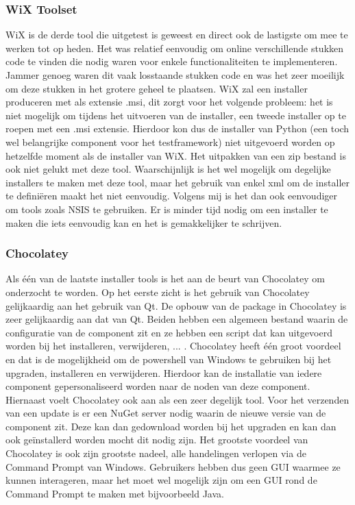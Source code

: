 \documentclass{article}
\begin{document}
\subsubsection{WiX Toolset}
WiX is de derde tool die uitgetest is geweest en direct ook de lastigste om mee te werken tot op heden.
Het was relatief eenvoudig om online verschillende stukken code te vinden die nodig waren voor enkele functionaliteiten te implementeren.
Jammer genoeg waren dit vaak losstaande stukken code en was het zeer moeilijk om deze stukken in het grotere geheel te plaatsen.
WiX zal een installer produceren met als extensie .msi, dit zorgt voor het volgende probleem: het is niet mogelijk om tijdens het uitvoeren van de installer, een tweede installer op te roepen met een .msi extensie.
Hierdoor kon dus de installer van Python (een toch wel belangrijke component voor het testframework) niet uitgevoerd worden op hetzelfde moment als de installer van WiX.
Het uitpakken van een zip bestand is ook niet gelukt met deze tool.
Waarschijnlijk is het wel mogelijk om degelijke installers te maken met deze tool, maar het gebruik van enkel xml om de installer te defini\"eren maakt het niet eenvoudig.
Volgens mij is het dan ook eenvoudiger om tools zoals NSIS te gebruiken.
Er is minder tijd nodig om een installer te maken die iets eenvoudig kan en het is gemakkelijker te schrijven.

\subsubsection{Chocolatey}
Als \'e\'en van de laatste installer tools is het aan de beurt van Chocolatey om onderzocht te worden.
Op het eerste zicht is het gebruik van Chocolatey gelijkaardig aan het gebruik van Qt.
De opbouw van de package in Chocolatey is zeer gelijkaardig aan dat van Qt.
Beiden hebben een algemeen bestand waarin de configuratie van de component zit en ze hebben een script dat kan uitgevoerd worden bij het installeren, verwijderen, ... .
Chocolatey heeft \'e\'en groot voordeel en dat is de mogelijkheid om de powershell van Windows te gebruiken bij het upgraden, installeren en verwijderen.
Hierdoor kan de installatie van iedere component gepersonaliseerd worden naar de noden van deze component.
Hiernaast voelt Chocolatey ook aan als een zeer degelijk tool.
Voor het verzenden van een update is er een NuGet server nodig waarin de nieuwe versie van de component zit.
Deze kan dan gedownload worden bij het upgraden en kan dan ook ge\"installerd worden mocht dit nodig zijn.
Het grootste voordeel van Chocolatey is ook zijn grootste nadeel, alle handelingen verlopen via de Command Prompt van Windows.
Gebruikers hebben dus geen GUI waarmee ze kunnen interageren, maar het moet wel mogelijk zijn om een GUI rond de Command Prompt te maken met bijvoorbeeld Java.
\end{document}
